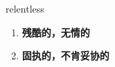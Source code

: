 
\begin{frame}
{\huge relentless}
\begin{center}
\begin{enumerate}\Large
  \item \textbf{残酷的，无情的}
  \item \textbf{固执的，不肯妥协的}
\end{enumerate}
\end{center}
\end{frame}
